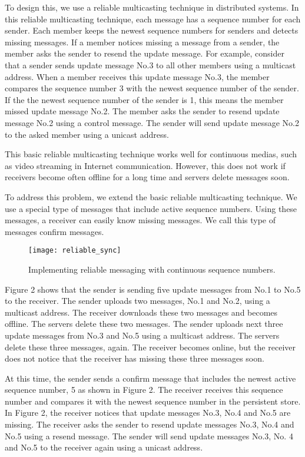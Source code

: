 To design this, we use a reliable multicasting technique in distributed systems\cite{tanenbaum2007distributed}.
In this reliable multicasting technique, each message has a sequence number for each sender.
Each member keeps the newest sequence numbers for senders and detects missing messages.
If a member notices missing a message from a sender, the member asks the sender to resend the update message.
For example, consider that a sender sends update message No.3 to all other members using a multicast address.
When a member receives this update message No.3, the member compares the sequence number 3 with the newest sequence number of the sender.
If the the newest sequence number of the sender is 1, this means the member missed update message No.2.
The member asks the sender to resend update message No.2 using a control message.
The sender will send update message No.2 to the asked member using a unicast address.

This basic reliable multicasting technique works well for continuous medias, such as video streaming in Internet communication.
However, this does not work if receivers become often offline for a long time and servers delete messages soon.

To address this problem, we extend the basic reliable multicasting technique.
We use a special type of messages that include active sequence numbers.
Using these messages, a receiver can easily know missing messages.
We call this type of messages confirm messages.

\begin{figure}[t]
	\centering
	\texttt{[image: reliable\_sync]}
	\caption{Implementing reliable messaging with continuous sequence numbers.}
\end{figure}

Figure 2 shows that the sender is sending five update messages from No.1 to No.5 to the receiver.
The sender uploads two messages, No.1 and No.2,  using a multicast address.
The receiver downloads these two messages and becomes offline.
The servers delete these two messages.
The sender uploads next three update messages from No.3 and No.5  using a multicast address.
The servers delete these three messages, again.
The receiver becomes online, but the receiver does not notice that the receiver has missing these three messages soon.

At this time, the sender sends a confirm message that includes the newest active sequence number, 5 as shown in Figure 2.
The receiver receives this sequence number and compares it with the newest sequence number in the persistent store.
In Figure 2, the receiver notices that update messages No.3, No.4 and No.5 are missing.
The receiver asks the sender to resend update messages No.3, No.4 and No.5 using a resend message.
The sender will send update messages No.3, No. 4 and No.5 to the receiver again using a unicast address.

